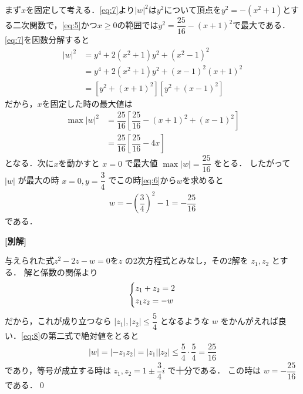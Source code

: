 \documentclass[../../main.tex]{subfiles}
\begin{document}
まず$x$を固定して考える．\cref{eq:7}より$|w|^2$は$y^2$について頂点を$y^2=-(x^2+1)$とする二次関数で，\cref{eq:5}かつ$x \ge 0$の範囲では$y^2=\dfrac{25}{16}-(x+1)^2$で最大である．\cref{eq:7}を因数分解すると
\begin{align}
  |w|^2
  &= y^4 + 2(x^2+1)y^2 + (x^2 - 1)^2 \\
  &= y^4 + 2(x^2+1)y^2 + (x-1)^2(x+1)^2 \\
  &= \left[y^2+ (x+1)^2\right]\left[y^2+(x-1)^2\right]
\end{align}
だから，$x$を固定した時の最大値は
\begin{align}
  \max |w|^2
  &= \dfrac{25}{16} \left[\dfrac{25}{16}-(x+1)^2 + (x-1)^2\right] \\
  &= \dfrac{25}{16} \left[\dfrac{25}{16}-4x\right]
\end{align}
となる．次に$x$を動かすと $x=0$ で最大値 $\max |w| = \dfrac{25}{16}$ をとる．
したがって $|w|$ が最大の時 $x=0, y=\dfrac{3}{4}$ でこの時\cref{eq:6}から$w$を求めると
\begin{align}
  w = -\left(\dfrac{3}{4}\right)^2-1 = -\dfrac{25}{16}
\end{align}
である．

{\bf [別解]}

与えられた式$z^2 - 2z - w = 0$を$z$ の2次方程式とみなし，その2解を $z_1, z_2$ とする．
解と係数の関係より
\begin{align}
  \begin{dcases}
    z_1 + z_2 = 2 \\
    z_1 z_2 = -w
  \end{dcases} \label{eq:8}
\end{align}
だから，これが成り立つなら $|z_1|, |z_2| \le \dfrac{5}{4}$ となるような $w$ をかんがえれば良い．\cref{eq:8}の第二式で絶対値をとると
\begin{align}
  |w| = |-z_1 z_2| = |z_1| |z_2| \le \dfrac{5}{4}\cdot\dfrac{5}{4} = \dfrac{25}{16}
\end{align}
であり，等号が成立する時は $z_1, z_2 = 1 \pm \dfrac{3}{4}i$ で十分である．
この時は $w = -\dfrac{25}{16}$ である．\qed
\end{document}
